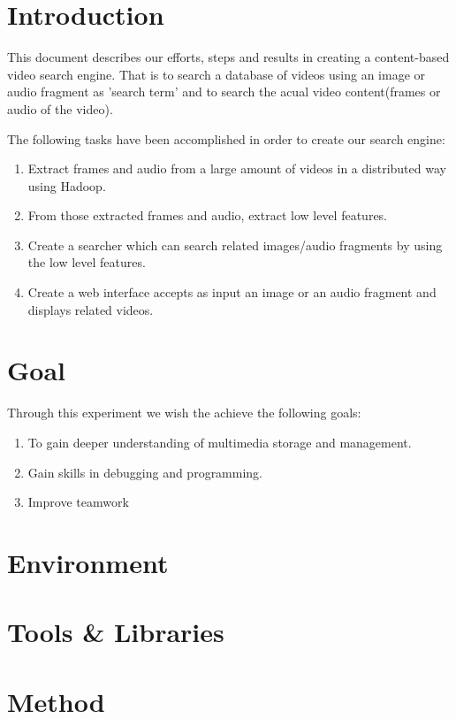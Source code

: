 \documentclass[a4paper,10pt]{article}
\begin{document}
\section{Introduction}
This document describes our efforts, steps and results in creating
a content-based video search engine. That is to search a database
of videos using an image or audio fragment as 'search term' and to
search the acual video content(frames or audio of the video).

The following tasks have been accomplished in order to create
our search engine:
\begin{enumerate}
  \setlength{\itemsep}{1pt}
  \setlength{\parskip}{1pt}
  \setlength{\parsep}{0pt}
 \item Extract frames and audio from a large amount of videos in a distributed way using Hadoop.
 \item From those extracted frames and audio, extract low level features.
 \item Create a searcher which can search related images/audio fragments by using the low level features.
 \item Create a web interface accepts as input an image or an audio fragment and displays related videos.
\end{enumerate}


\section{Goal}
Through this experiment we wish the achieve the following goals:
\begin{enumerate}
  \setlength{\itemsep}{1pt}
  \setlength{\parskip}{1pt}
  \setlength{\parsep}{0pt}
 \item To gain deeper understanding of multimedia storage and management.
 \item Gain skills in debugging and programming.
 \item Improve teamwork
\end{enumerate}


\section{Environment}


\section{Tools \& Libraries}


\section{Method}
\end{document}
